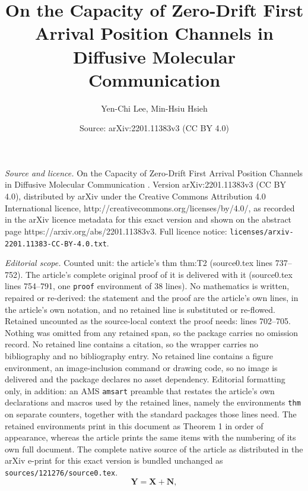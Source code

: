 \documentclass[10pt,a4paper]{amsart}
\title{On the Capacity of Zero-Drift First Arrival Position Channels in Diffusive Molecular Communication }
\author{Yen-Chi Lee, Min-Hsiu Hsieh}
\date{Source: arXiv:2201.11383v3 (CC BY 4.0)}
\begin{document}
\maketitle

\noindent\emph{Source and licence.} On the Capacity of Zero-Drift First Arrival Position Channels in Diffusive Molecular Communication . Version arXiv:2201.11383v3 (CC BY 4.0), distributed by arXiv under the Creative Commons Attribution 4.0 International licence, http://creativecommons.org/licenses/by/4.0/, as recorded in the arXiv licence metadata for this exact version and shown on the abstract page https://arxiv.org/abs/2201.11383v3. Full licence notice: \texttt{licenses/arxiv-2201.11383-CC-BY-4.0.txt}.\par\smallskip

\noindent\textit{Editorial scope.} Counted unit: the article's thm thm:T2 (source0.tex lines 737--752). The article's complete original proof of it is delivered with it (source0.tex lines 754--791, one \texttt{proof} environment of 38 lines). No mathematics is written, repaired or re-derived: the statement and the proof are the article's own lines, in the article's own notation, and no retained line is substituted or re-flowed.  Retained uncounted as the source-local context the proof needs: lines 702--705.  Nothing was omitted from any retained span, so the package carries no omission record.  No retained line contains a citation, so the wrapper carries no bibliography and no bibliography entry.  No retained line contains a figure environment, an image-inclusion command or drawing code, so no image is delivered and the package declares no asset dependency.  Editorial formatting only, in addition: an AMS \texttt{amsart} preamble that restates the article's own declarations and macros used by the retained lines, namely the environments \texttt{thm} on separate counters, together with the standard packages those lines need.  The retained environments print in this document as Theorem 1 in order of appearance, whereas the article prints the same items with the numbering of its own full document.  The complete native source of the article as distributed in the arXiv e-print for this exact version is bundled unchanged as \texttt{sources/121276/source0.tex}.
\begin{equation}
    \mathbf{Y}=\mathbf{X}+\mathbf{N},
\label{eq:45}
\end{equation}
\end{document}
